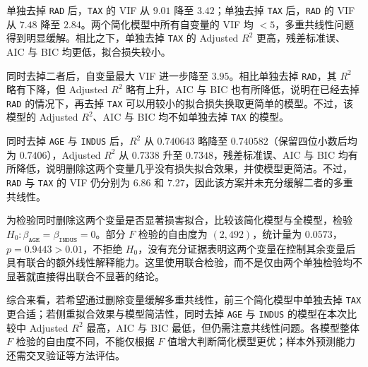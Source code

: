 \documentclass[12pt,a4paper]{article}
\begin{document}
\begin{answerbox}
单独去掉 \texttt{RAD} 后，\texttt{TAX} 的 VIF 从 $9.01$ 降至 $3.42$；单独去掉 \texttt{TAX} 后，\texttt{RAD} 的 VIF 从 $7.48$ 降至 $2.84$。两个简化模型中所有自变量的 VIF 均 $<5$，多重共线性问题得到明显缓解。相比之下，单独去掉 \texttt{TAX} 的 Adjusted $R^2$ 更高，残差标准误、AIC 与 BIC 均更低，拟合损失较小。

同时去掉二者后，自变量最大 VIF 进一步降至 $3.95$。相比单独去掉 \texttt{RAD}，其 $R^2$ 略有下降，但 Adjusted $R^2$ 略有上升，AIC 与 BIC 也有所降低，说明在已经去掉 \texttt{RAD} 的情况下，再去掉 \texttt{TAX} 可以用较小的拟合损失换取更简单的模型。不过，该模型的 Adjusted $R^2$、AIC 与 BIC 均不如单独去掉 \texttt{TAX} 的模型。

同时去掉 \texttt{AGE} 与 \texttt{INDUS} 后，$R^2$ 从 $0.740643$ 略降至 $0.740582$（保留四位小数后均为 $0.7406$），Adjusted $R^2$ 从 $0.7338$ 升至 $0.7348$，残差标准误、AIC 与 BIC 均有所降低，说明删除这两个变量几乎没有损失拟合效果，并使模型更简洁。不过，\texttt{RAD} 与 \texttt{TAX} 的 VIF 仍分别为 $6.86$ 和 $7.27$，因此该方案并未充分缓解二者的多重共线性。

为检验同时删除这两个变量是否显著损害拟合，比较该简化模型与全模型，检验 $H_0:\beta_{\texttt{AGE}}=\beta_{\texttt{INDUS}}=0$。部分 $F$ 检验的自由度为 $(2,492)$，统计量为 $0.0573$，$p=0.9443>0.01$，不拒绝 $H_0$，没有充分证据表明这两个变量在控制其余变量后具有联合的额外线性解释能力。这里使用联合检验，而不是仅由两个单独检验均不显著就直接得出联合不显著的结论。

综合来看，若希望通过删除变量缓解多重共线性，前三个简化模型中单独去掉 \texttt{TAX} 更合适；若侧重拟合效果与模型简洁性，同时去掉 \texttt{AGE} 与 \texttt{INDUS} 的模型在本次比较中 Adjusted $R^2$ 最高，AIC 与 BIC 最低，但仍需注意共线性问题。各模型整体 $F$ 检验的自由度不同，不能仅根据 $F$ 值增大判断简化模型更优；样本外预测能力还需交叉验证等方法评估。

\end{answerbox}
\end{document}
